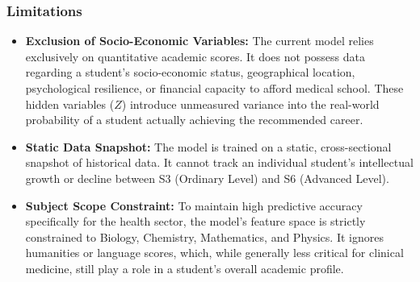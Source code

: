 \subsubsection{Limitations}
\begin{itemize}
    \item \textbf{Exclusion of Socio-Economic Variables:} The current model relies exclusively on quantitative academic scores. It does not possess data regarding a student's socio-economic status, geographical location, psychological resilience, or financial capacity to afford medical school. These hidden variables ($Z$) introduce unmeasured variance into the real-world probability of a student actually achieving the recommended career.
    \item \textbf{Static Data Snapshot:} The model is trained on a static, cross-sectional snapshot of historical data. It cannot track an individual student's intellectual growth or decline between S3 (Ordinary Level) and S6 (Advanced Level).
    \item \textbf{Subject Scope Constraint:} To maintain high predictive accuracy specifically for the health sector, the model's feature space is strictly constrained to Biology, Chemistry, Mathematics, and Physics. It ignores humanities or language scores, which, while generally less critical for clinical medicine, still play a role in a student's overall academic profile.
\end{itemize}

